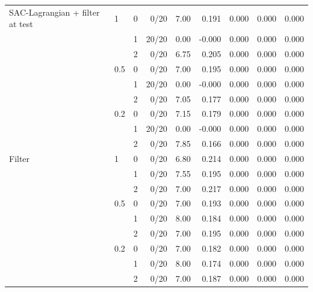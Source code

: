 {\begin{tabular}{llrrrrrrr}
\addlinespace
SAC-Lagrangian + filter at test & 1 & 0 & 0/20 & 7.00 & 0.191 & 0.000 & 0.000 & 0.000 \\
 &  & 1 & 20/20 & 0.00 & -0.000 & 0.000 & 0.000 & 0.000 \\
 &  & 2 & 0/20 & 6.75 & 0.205 & 0.000 & 0.000 & 0.000 \\
 & 0.5 & 0 & 0/20 & 7.00 & 0.195 & 0.000 & 0.000 & 0.000 \\
 &  & 1 & 20/20 & 0.00 & -0.000 & 0.000 & 0.000 & 0.000 \\
 &  & 2 & 0/20 & 7.05 & 0.177 & 0.000 & 0.000 & 0.000 \\
 & 0.2 & 0 & 0/20 & 7.15 & 0.179 & 0.000 & 0.000 & 0.000 \\
 &  & 1 & 20/20 & 0.00 & -0.000 & 0.000 & 0.000 & 0.000 \\
 &  & 2 & 0/20 & 7.85 & 0.166 & 0.000 & 0.000 & 0.000 \\
\addlinespace
Filter & 1 & 0 & 0/20 & 6.80 & 0.214 & 0.000 & 0.000 & 0.000 \\
 &  & 1 & 0/20 & 7.55 & 0.195 & 0.000 & 0.000 & 0.000 \\
 &  & 2 & 0/20 & 7.00 & 0.217 & 0.000 & 0.000 & 0.000 \\
 & 0.5 & 0 & 0/20 & 7.00 & 0.193 & 0.000 & 0.000 & 0.000 \\
 &  & 1 & 0/20 & 8.00 & 0.184 & 0.000 & 0.000 & 0.000 \\
 &  & 2 & 0/20 & 7.00 & 0.195 & 0.000 & 0.000 & 0.000 \\
 & 0.2 & 0 & 0/20 & 7.00 & 0.182 & 0.000 & 0.000 & 0.000 \\
 &  & 1 & 0/20 & 8.00 & 0.174 & 0.000 & 0.000 & 0.000 \\
 &  & 2 & 0/20 & 7.00 & 0.187 & 0.000 & 0.000 & 0.000 \\
\bottomrule\end{tabular}}
